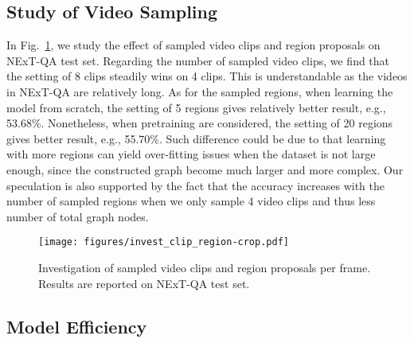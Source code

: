 \documentclass[runningheads]{llncs}
\newcommand{\eg}{e.g.}
\begin{document}
\subsection{Study of Video Sampling}
\label{app:sap}
In Fig.~\ref{fig:region}, we study the effect of sampled video clips and region proposals on NExT-QA \cite{xiao2021next} test set. Regarding the number of sampled video clips, we find that the setting of 8 clips steadily wins on 4 clips. This is understandable as the videos in NExT-QA are relatively long. As for the sampled regions, when learning the model from scratch, the setting of 5 regions gives relatively better result, \eg, 53.68\%. Nonetheless, when pretraining are considered, the setting of 20 regions gives better result, \eg, 55.70\%. Such difference could be due to that learning with more regions can yield over-fitting issues when the dataset is not large enough, since the constructed graph become much larger and more complex. Our speculation is also supported by the fact that the accuracy increases with the number of sampled regions when we only sample 4 video clips and thus less number of total graph nodes.
\begin{figure}[t!]
  \begin{center}
    \texttt{[image: figures/invest\_clip\_region-crop.pdf]}
  \end{center}
  \vspace{-0.2cm}
  \caption{Investigation of sampled video clips and region proposals per frame. Results are reported on NExT-QA test set.}
  \label{fig:region}
\end{figure}

\subsection{Model Efficiency}
\label{app:eff}
\setlength{\tabcolsep}{3pt}
\begin{table}[t!]
    \small
    \centering
    \caption{Comparison of memory and time based on NExT-QA \cite{xiao2021next}. (2m8: 2 minutes per epoch and 8 epochs in total.) 
    }
    \vspace{-0.2cm}
    \label{tab:tm}
    \vspace{-0.4cm}
\end{table}
\end{document}
